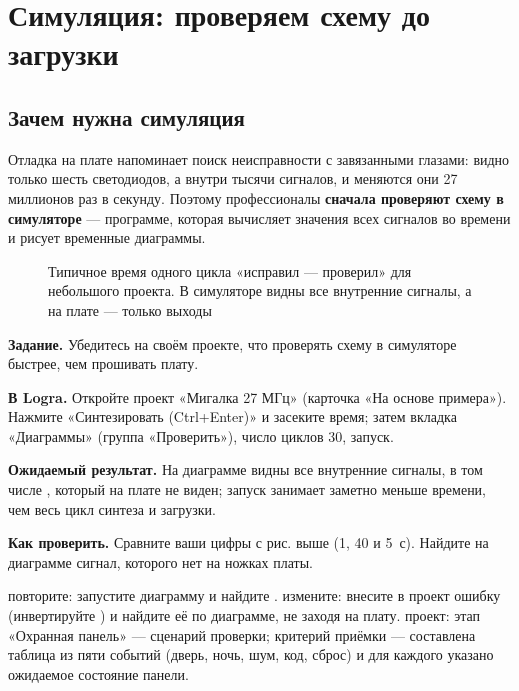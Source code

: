 \chapter{Симуляция: проверяем схему до загрузки}
\label{ch:sim}

\section{Зачем нужна симуляция}

Отладка на плате напоминает поиск неисправности с завязанными глазами:
видно только шесть светодиодов, а внутри тысячи сигналов, и меняются они
27 миллионов раз в секунду. Поэтому профессионалы \textbf{сначала
проверяют схему в симуляторе} --- программе, которая вычисляет значения всех
сигналов во времени и рисует временные диаграммы.

\begin{figure}[H]
\centering
{}
\caption{Типичное время одного цикла «исправил --- проверил» для небольшого
проекта. В симуляторе видны все внутренние сигналы, а на плате --- только
выходы}
\end{figure}

\begin{diybox}
\textbf{Задание.} Убедитесь на своём проекте, что проверять схему в симуляторе быстрее, чем прошивать плату.

\textbf{В Logra.} Откройте проект «Мигалка 27 МГц» (карточка «На основе примера»). Нажмите «Синтезировать (Ctrl+Enter)» и засеките время; затем вкладка «Диаграммы» (группа «Проверить»), число циклов 30, запуск.

\textbf{Ожидаемый результат.} На диаграмме видны все внутренние сигналы, в том числе , который на плате не виден; запуск занимает заметно меньше времени, чем весь цикл синтеза и загрузки.

\textbf{Как проверить.} Сравните ваши цифры с рис. выше (1, 40 и 5~с). Найдите на диаграмме сигнал, которого нет на ножках платы.

 повторите: запустите диаграмму и найдите .  измените: внесите в проект ошибку (инвертируйте ) и найдите её по диаграмме, не заходя на плату.  проект: этап «Охранная панель» --- сценарий проверки; критерий приёмки --- составлена таблица из пяти событий (дверь, ночь, шум, код, сброс) и для каждого указано ожидаемое состояние панели.
\end{diybox}

